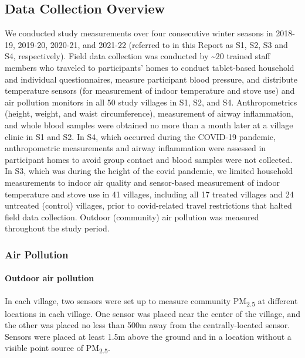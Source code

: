 \documentclass[
  letterpaper,
  DIV=11,
  numbers=noendperiod]{scrartcl}
\let\oldparagraph\paragraph
\renewcommand{\paragraph}[1]{\oldparagraph{#1}\mbox{}}
\begin{document}
\hypertarget{data-collection-overview}{%
\subsection{Data Collection Overview}\label{data-collection-overview}}

We conducted study measurements over four consecutive winter seasons in
2018-19, 2019-20, 2020-21, and 2021-22 (referred to in this Report as
S1, S2, S3 and S4, respectively). Field data collection was conducted by
\textasciitilde20 trained staff members who traveled to participants'
homes to conduct tablet-based household and individual questionnaires,
measure participant blood pressure, and distribute temperature sensors
(for measurement of indoor temperature and stove use) and air pollution
monitors in all 50 study villages in S1, S2, and S4. Anthropometrics
(height, weight, and waist circumference), measurement of airway
inflammation, and whole blood samples were obtained no more than a month
later at a village clinic in S1 and S2. In S4, which occurred during the
COVID-19 pandemic, anthropometric measurements and airway inflammation
were assessed in participant homes to avoid group contact and blood
samples were not collected. In S3, which was during the height of the
covid pandemic, we limited household measurements to indoor air quality
and sensor-based measurement of indoor temperature and stove use in 41
villages, including all 17 treated villages and 24 untreated (control)
villages, prior to covid-related travel restrictions that halted field
data collection. Outdoor (community) air pollution was measured
throughout the study period.

\hypertarget{air-pollution}{%
\subsubsection{Air Pollution}\label{air-pollution}}

\hypertarget{outdoor-air-pollution}{%
\paragraph{Outdoor air pollution}\label{outdoor-air-pollution}}

In each village, two sensors were set up to measure community
PM\textsubscript{2.5} at different locations in each village. One sensor
was placed near the center of the village, and the other was placed no
less than 500m away from the centrally-located sensor. Sensors were
placed at least 1.5m above the ground and in a location without a
visible point source of PM\textsubscript{2.5}.
\end{document}
